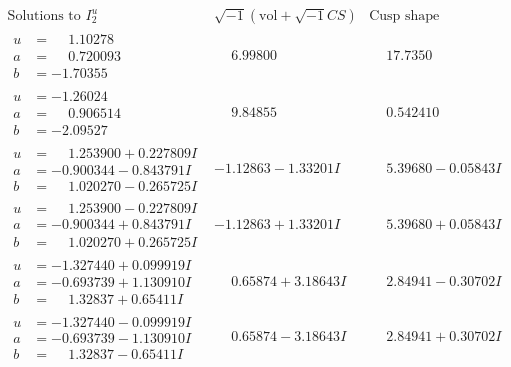 \documentclass[1p]{elsarticle_modified}
\theoremstyle{definition}
\newcommand{\I}{\sqrt{-1}}
\begin{document}
$$\begin{array}{c|c|c}  
\text{Solutions to }I^u_{2}& \I (\text{vol} + \sqrt{-1}CS) & \text{Cusp shape}\\
 \hline 
\begin{aligned}
u &= \phantom{-}1.10278\phantom{ +0.000000I} \\
a &= \phantom{-}0.720093\phantom{ +0.000000I} \\
b &= -1.70355\phantom{ +0.000000I}\end{aligned}
 & \phantom{-}6.99800\phantom{ +0.000000I} & \phantom{-}17.7350\phantom{ +0.000000I} \\ \hline\begin{aligned}
u &= -1.26024\phantom{ +0.000000I} \\
a &= \phantom{-}0.906514\phantom{ +0.000000I} \\
b &= -2.09527\phantom{ +0.000000I}\end{aligned}
 & \phantom{-}9.84855\phantom{ +0.000000I} & \phantom{-}0.542410\phantom{ +0.000000I} \\ \hline\begin{aligned}
u &= \phantom{-}1.253900 + 0.227809 I \\
a &= -0.900344 - 0.843791 I \\
b &= \phantom{-}1.020270 - 0.265725 I\end{aligned}
 & -1.12863 - 1.33201 I & \phantom{-}5.39680 - 0.05843 I \\ \hline\begin{aligned}
u &= \phantom{-}1.253900 - 0.227809 I \\
a &= -0.900344 + 0.843791 I \\
b &= \phantom{-}1.020270 + 0.265725 I\end{aligned}
 & -1.12863 + 1.33201 I & \phantom{-}5.39680 + 0.05843 I \\ \hline\begin{aligned}
u &= -1.327440 + 0.099919 I \\
a &= -0.693739 + 1.130910 I \\
b &= \phantom{-}1.32837 + 0.65411 I\end{aligned}
 & \phantom{-}0.65874 + 3.18643 I & \phantom{-}2.84941 - 0.30702 I \\ \hline\begin{aligned}
u &= -1.327440 - 0.099919 I \\
a &= -0.693739 - 1.130910 I \\
b &= \phantom{-}1.32837 - 0.65411 I\end{aligned}
 & \phantom{-}0.65874 - 3.18643 I & \phantom{-}2.84941 + 0.30702 I \\ \hline\begin{aligned}

\end{aligned}
\end{array}$$
\end{document}

